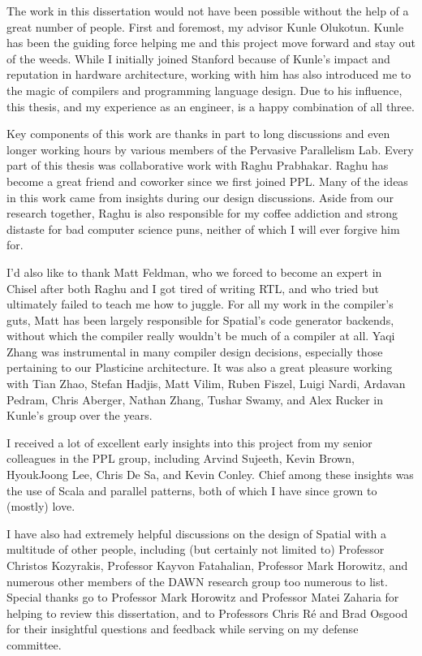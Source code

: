 The work in this dissertation would not have been possible without the help of
a great number of people. First and foremost, my advisor Kunle Olukotun.
Kunle has been the guiding force helping me and this
project move forward and stay out of the weeds. While I initially joined Stanford
because of Kunle's impact and reputation in hardware architecture, working with him
has also introduced me to the magic of compilers and programming language design.
Due to his influence, this thesis, and my experience as an engineer, is a
happy combination of all three.

Key components of this work are thanks in part to long discussions and even longer
working hours by various members of the Pervasive Parallelism Lab.
Every part of this thesis was collaborative work with Raghu Prabhakar.
Raghu has become a great friend and coworker since we first joined PPL. Many of
the ideas in this work came from insights during our design discussions.
Aside from our research together, Raghu is also responsible for my
coffee addiction and strong distaste for bad computer science puns, neither of
which I will ever forgive him for.

I'd also like to thank Matt Feldman, who we forced to become an expert in Chisel
after both Raghu and I got tired of writing RTL,
and who tried but ultimately failed to teach me how to juggle.
For all my work in the compiler's guts, Matt has been largely
responsible for Spatial's code generator backends, without which the
compiler really wouldn't be much of a compiler at all.
Yaqi Zhang was instrumental in many compiler design decisions, especially those
pertaining to our Plasticine architecture.
It was also a great pleasure working with Tian Zhao, Stefan Hadjis, Matt Vilim,
Ruben Fiszel, Luigi Nardi, Ardavan Pedram, Chris Aberger, Nathan Zhang,
Tushar Swamy, and Alex Rucker in Kunle's group over the years.

I received a lot of excellent early insights into this project from my senior
colleagues in the PPL group, including Arvind Sujeeth, Kevin Brown, HyoukJoong
Lee, Chris De Sa, and Kevin Conley. Chief among these insights was the use of
Scala and parallel patterns, both of which I have since grown to (mostly) love.

I have also had extremely helpful discussions on the design of Spatial
with a multitude of other people, including (but certainly not limited to)
Professor Christos Kozyrakis, Professor Kayvon Fatahalian, Professor Mark Horowitz,
and numerous other members of the DAWN research group too numerous to list.
Special thanks go to Professor Mark Horowitz and Professor Matei Zaharia for
helping to review this dissertation, and to Professors Chris R\'{e} and Brad
Osgood for their insightful questions and feedback while
serving on my defense committee. 


